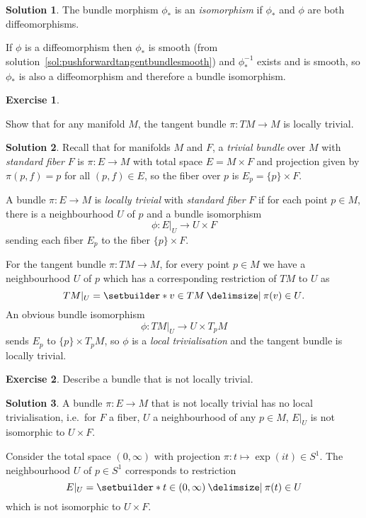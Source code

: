 \documentclass[11pt, a4paper]{report}
\theoremstyle{definition}
\newtheorem{exercise}{Exercise}[part]
\newtheorem{solution}{Solution}[part]
\newenvironment{ex}{\begin{exercise}}{\end{exercise}\pagebreak[1]}
\newenvironment{sol}{\begin{solution}}{\end{solution}\pagebreak[3]}
\begin{document}
\begin{sol}

The bundle morphism $\phi_*$ is an \emph{isomorphism} if $\phi_*$ and $\phi$ are both diffeomorphisms.

If $\phi$ is a diffeomorphism then $\phi_*$ is smooth (from solution~\ref{sol:pushforwardtangentbundlesmooth}) and $\phi_*^{-1}$ exists and is smooth, so $\phi_*$ is also a diffeomorphism and therefore a bundle isomorphism.

\end{sol}

\begin{ex}\label{ex:tangentbundlelocallytrivial}

Show that for any manifold $M$, the tangent bundle $\pi: TM \to M$ is locally trivial.

\end{ex}

\begin{sol}

Recall that for manifolds $M$ and $F$, a \emph{trivial bundle} over $M$ with \emph{standard fiber} $F$ is $\pi: E \to M$ with total space $E = M \times F$ and projection given by $\pi(p, f) = p$ for all $(p, f) \in E$, so the fiber over $p$ is $E_p = \{p\} \times F$.

A bundle $\pi: E \to M$ is \emph{locally trivial} with \emph{standard fiber} $F$ if for each point $p \in M$, there is a neighbourhood $U$ of $p$ and a bundle isomorphism
\[
    \phi: E |_U \to U \times F
\]
sending each fiber $E_p$ to the fiber $\{p\} \times F$.

For the tangent bundle $\pi: TM \to M$, for every point $p \in M$ we have a neighbourhood $U$ of $p$ which has a corresponding restriction of $TM$ to $U$ as
\[
    TM|_U = \setbuilder*{v \in TM \given \pi(v) \in U}.
\]
An obvious bundle isomorphism
\[
    \phi: TM|_U \to U \times T_p M
\]
sends $E_p$ to $\{p\} \times T_p M$, so $\phi$ is a \emph{local trivialisation} and the tangent bundle is locally trivial.

\end{sol}

\begin{ex}

Describe a bundle that is not locally trivial.

\end{ex}

\begin{sol}

A bundle $\pi: E \to M$ that is not locally trivial has no local trivialisation, i.e.\ for $F$ a fiber, $U$ a neighbourhood of any $p \in M$, $E|_U$ is not isomorphic to $U \times F$.

Consider the total space $(0, \infty)$ with projection $\pi: t \mapsto \exp(it) \in S^1$.
The neighbourhood $U$ of $p \in S^1$ corresponds to restriction
\[
    E|_U = \setbuilder*{t \in (0, \infty) \given \pi(t) \in U}
\]
which is not isomorphic to $U \times F$.

\end{sol}
\end{document}
